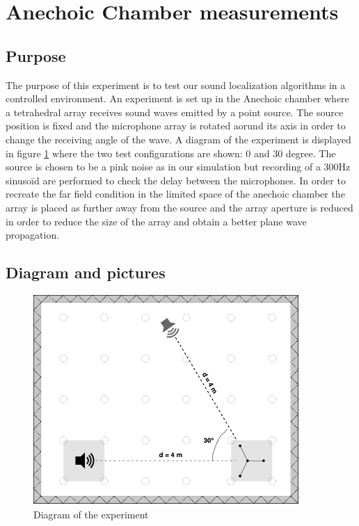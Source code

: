 \newpage

\section{Anechoic Chamber measurements}

\subsection{Purpose}

The purpose of this experiment is to test our sound localization algorithms in a controlled environment. An experiment is set up in the Anechoic chamber where a tetrahedral array receives sound waves emitted by a point source. The source position is fixed and the microphone array is rotated aorund its axis in order to change the receiving angle of the wave. A diagram of the experiment is displayed in figure \ref{fig:Anechoic1} where the two test configurations are shown: 0 and 30 degree.  The source is chosen to be a pink noise as in our simulation but recording of a 300Hz sinusoïd are performed to check the delay between the microphones. In order to recreate the far field condition in the limited space of the anechoic chamber the array is placed as further away from the source and the array aperture is reduced in order to reduce the size of the array and obtain a better plane wave propagation. 

\subsection{Diagram and pictures}



\begin{figure}[H]
    \centering
    \includegraphics[width=0.9\textwidth]{Figures/Anechoic1.png}
    \caption{Diagram of the experiment}
    \label{fig:Anechoic1}
\end{figure}
 
